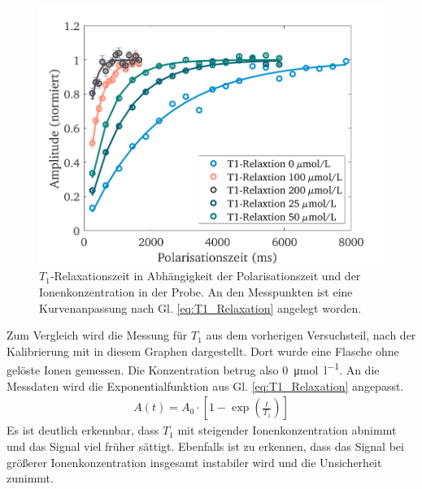 \documentclass[../main.tex]{subfiles}
\begin{document}
    \begin{figure}[h!]
        \centering
        \includegraphics[width=\textwidth]{Bilddateien/11/T1/Part_11_Fig_6}
        \caption{$T_{1}$-Relaxationszeit in Abhängigkeit der Polarisationszeit und der Ionenkonzentration in der Probe. An den Messpunkten ist eine Kurvenanpassung nach Gl. \ref{eq:T1_Relaxation} angelegt worden.}
        \label{fig:Relaxation_T1}
    \end{figure}
    Zum Vergleich wird die Messung für $T_{1}$ aus dem vorherigen Versuchsteil, nach der Kalibrierung mit in diesem Graphen dargestellt. Dort wurde eine Flasche ohne gelöste Ionen gemessen. Die Konzentration betrug also \SI{0}{\micro \mol \per \litre}. An die Messdaten wird die Exponentialfunktion aus Gl. \ref{eq:T1_Relaxation} angepasst.
    \begin{align} \label{eq:T1_Relaxation}
        A(t) = A_{0} \cdot \left[1 - \exp\left( \frac{t}{T_{1}}\right) \right]
    \end{align}
    Es ist deutlich erkennbar, dass $T_{1}$ mit steigender Ionenkonzentration abnimmt und das Signal viel früher sättigt. Ebenfalls ist zu erkennen, dass das Signal bei größerer Ionenkonzentration insgesamt instabiler wird und die Unsicherheit zunimmt. 
\end{document}
